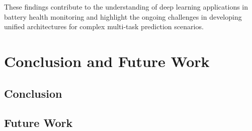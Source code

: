 These findings contribute to the understanding of deep learning applications in battery health monitoring and highlight the ongoing challenges in developing unified architectures for complex multi-task prediction scenarios.

\chapter{Conclusion and Future Work}
\label{sec:conclusion_future_work}
\lipsum[1]
\section{Conclusion}
\lipsum[5-6]
\section{Future Work}
\lipsum[7-8]


